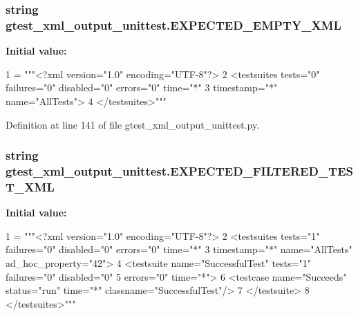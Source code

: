 \subsubsection[{\texorpdfstring{E\+X\+P\+E\+C\+T\+E\+D\+\_\+\+E\+M\+P\+T\+Y\+\_\+\+X\+ML}{EXPECTED_EMPTY_XML}}]{\setlength{\rightskip}{0pt plus 5cm}string gtest\+\_\+xml\+\_\+output\+\_\+unittest.\+E\+X\+P\+E\+C\+T\+E\+D\+\_\+\+E\+M\+P\+T\+Y\+\_\+\+X\+ML}\hypertarget{namespacegtest__xml__output__unittest_abe1569d019b037f006986004349c7cf3}{}\label{namespacegtest__xml__output__unittest_abe1569d019b037f006986004349c7cf3}
{\bfseries Initial value\+:}
\begin{DoxyCode}
1 = \textcolor{stringliteral}{"""<?xml version="1.0" encoding="UTF-8"?>}
2 \textcolor{stringliteral}{<testsuites tests="0" failures="0" disabled="0" errors="0" time="*"}
3 \textcolor{stringliteral}{            timestamp="*" name="AllTests">}
4 \textcolor{stringliteral}{</testsuites>"""}
\end{DoxyCode}


Definition at line 141 of file gtest\+\_\+xml\+\_\+output\+\_\+unittest.\+py.

\subsubsection[{\texorpdfstring{E\+X\+P\+E\+C\+T\+E\+D\+\_\+\+F\+I\+L\+T\+E\+R\+E\+D\+\_\+\+T\+E\+S\+T\+\_\+\+X\+ML}{EXPECTED_FILTERED_TEST_XML}}]{\setlength{\rightskip}{0pt plus 5cm}string gtest\+\_\+xml\+\_\+output\+\_\+unittest.\+E\+X\+P\+E\+C\+T\+E\+D\+\_\+\+F\+I\+L\+T\+E\+R\+E\+D\+\_\+\+T\+E\+S\+T\+\_\+\+X\+ML}\hypertarget{namespacegtest__xml__output__unittest_a1adb060422f833cb8b99403d13144399}{}\label{namespacegtest__xml__output__unittest_a1adb060422f833cb8b99403d13144399}
{\bfseries Initial value\+:}
\begin{DoxyCode}
1 = \textcolor{stringliteral}{"""<?xml version="1.0" encoding="UTF-8"?>}
2 \textcolor{stringliteral}{<testsuites tests="1" failures="0" disabled="0" errors="0" time="*"}
3 \textcolor{stringliteral}{            timestamp="*" name="AllTests" ad\_hoc\_property="42">}
4 \textcolor{stringliteral}{  <testsuite name="SuccessfulTest" tests="1" failures="0" disabled="0"}
5 \textcolor{stringliteral}{             errors="0" time="*">}
6 \textcolor{stringliteral}{    <testcase name="Succeeds" status="run" time="*" classname="SuccessfulTest"/>}
7 \textcolor{stringliteral}{  </testsuite>}
8 \textcolor{stringliteral}{</testsuites>"""}
\end{DoxyCode}


